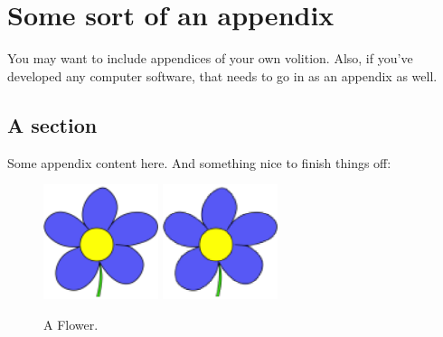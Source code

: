 ﻿
\chapter{Some sort of an appendix}
\label{appendix:somesort}

You may want to include appendices of your own volition. Also, if you've developed any computer software, that needs to go in as an appendix as well.

\section{A section}

Some appendix content here. And something nice to finish things off:

\begin{figure}[htb]
  \centering
  \ifpdf
    \includegraphics[width=0.3\textwidth]{graphics/mygraphic2.png}
  \else
    \includegraphics[width=0.3\textwidth]{graphics/mygraphic2-for-ps.eps}
  \fi
  \caption{A Flower.}
\end{figure}

